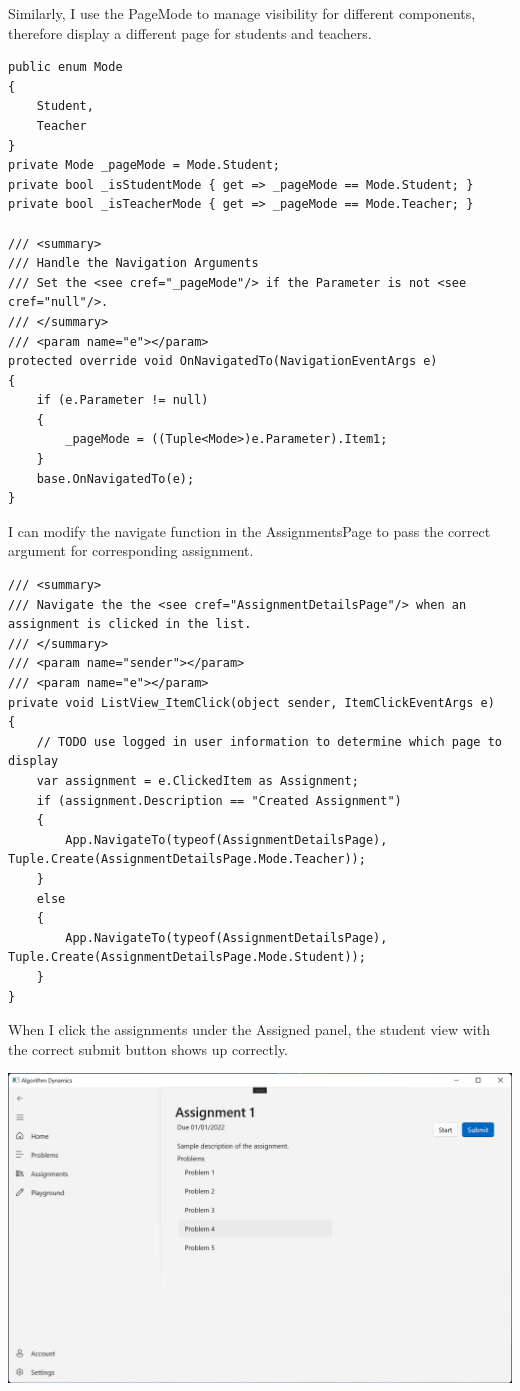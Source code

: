 \documentclass[a4paper]{report}
\begin{document}
Similarly, I use the PageMode to manage visibility for different components, therefore display a different page for students and teachers.

\begin{verbatim}
public enum Mode
{
    Student,
    Teacher
}
private Mode _pageMode = Mode.Student;
private bool _isStudentMode { get => _pageMode == Mode.Student; }
private bool _isTeacherMode { get => _pageMode == Mode.Teacher; }

/// <summary>
/// Handle the Navigation Arguments
/// Set the <see cref="_pageMode"/> if the Parameter is not <see cref="null"/>.
/// </summary>
/// <param name="e"></param>
protected override void OnNavigatedTo(NavigationEventArgs e)
{
    if (e.Parameter != null)
    {
        _pageMode = ((Tuple<Mode>)e.Parameter).Item1;
    }
    base.OnNavigatedTo(e);
}
\end{verbatim}

I can modify the navigate function in the AssignmentsPage to pass the correct argument for corresponding assignment.

\begin{verbatim}
/// <summary>
/// Navigate the the <see cref="AssignmentDetailsPage"/> when an assignment is clicked in the list.
/// </summary>
/// <param name="sender"></param>
/// <param name="e"></param>
private void ListView_ItemClick(object sender, ItemClickEventArgs e)
{
    // TODO use logged in user information to determine which page to display 
    var assignment = e.ClickedItem as Assignment;
    if (assignment.Description == "Created Assignment")
    {
        App.NavigateTo(typeof(AssignmentDetailsPage), Tuple.Create(AssignmentDetailsPage.Mode.Teacher));
    }
    else
    {
        App.NavigateTo(typeof(AssignmentDetailsPage), Tuple.Create(AssignmentDetailsPage.Mode.Student));
    }
}
\end{verbatim}

When I click the assignments under the Assigned panel, the student view with the correct submit button shows up correctly.

\includegraphics[width=\textwidth, height=\textheight, keepaspectratio]{AssignmentDetailsPage-Student}
\end{document}
